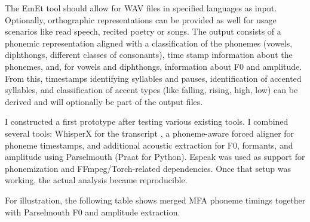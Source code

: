 The EmEt tool should allow for WAV files in specified languages as input. Optionally, orthographic representations can be provided as well for usage scenarios like read speech, recited poetry or songs. The output consists of a phonemic representation aligned with a classification of the phonemes (vowels, diphthongs, different classes of consonants), time stamp information about the phonemes, and, for vowels and diphthongs, information about F0 and amplitude. From this, timestamps identifying syllables and pauses, identification of accented syllables, and classification of accent types (like falling, rising, high, low) can be derived and will optionally be part of the output files.

I constructed a first prototype after testing various existing tools. I combined several tools: WhisperX for the transcript \cite{bain2023whisperx}, a phoneme-aware forced aligner for phoneme timestamps, and additional acoustic extraction for F0, formants, and amplitude using Parselmouth \cite{jadoul2018parselmouth} (Praat for Python). Espeak \cite{espeakng2024} was used as support for phonemization and FFmpeg/Torch-related dependencies. Once that setup was working, the actual analysis became reproducible.

For illustration, the following table shows merged MFA phoneme timings together with Parselmouth F0 and amplitude extraction.

